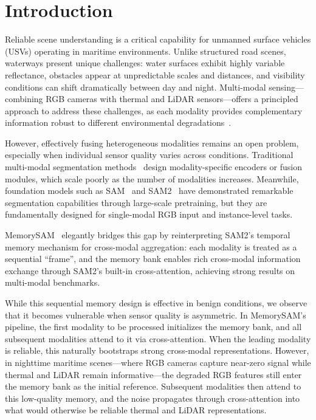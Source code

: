 \section{Introduction}
\label{sec:intro}

Reliable scene understanding is a critical capability for unmanned surface vehicles (USVs) operating in maritime environments.
Unlike structured road scenes, waterways present unique challenges: water surfaces exhibit highly variable reflectance, obstacles appear at unpredictable scales and distances, and visibility conditions can shift dramatically between day and night.
Multi-modal sensing---combining RGB cameras with thermal and LiDAR sensors---offers a principled approach to address these challenges, as each modality provides complementary information robust to different environmental degradations~\cite{zhang2023delivering, zhang2022cmx}.

However, effectively fusing heterogeneous modalities remains an open problem, especially when individual sensor quality varies across conditions.
Traditional multi-modal segmentation methods~\cite{zhang2023delivering, li2024stitchfusion, reza2024mmsformer} design modality-specific encoders or fusion modules, which scale poorly as the number of modalities increases.
Meanwhile, foundation models such as SAM~\cite{kirillov2023sam} and SAM2~\cite{ravi2024sam2} have demonstrated remarkable segmentation capabilities through large-scale pretraining, but they are fundamentally designed for single-modal RGB input and instance-level tasks.

MemorySAM~\cite{chen2025memorysam} elegantly bridges this gap by reinterpreting SAM2's temporal memory mechanism for cross-modal aggregation: each modality is treated as a sequential ``frame'', and the memory bank enables rich cross-modal information exchange through SAM2's built-in cross-attention, achieving strong results on multi-modal benchmarks.

While this sequential memory design is effective in benign conditions, we observe that it becomes vulnerable when sensor quality is asymmetric.
In MemorySAM's pipeline, the first modality to be processed initializes the memory bank, and all subsequent modalities attend to it via cross-attention.
When the leading modality is reliable, this naturally bootstraps strong cross-modal representations.
However, in nighttime maritime scenes---where RGB cameras capture near-zero signal while thermal and LiDAR remain informative---the degraded RGB features still enter the memory bank as the initial reference.
Subsequent modalities then attend to this low-quality memory, and the noise propagates through cross-attention into what would otherwise be reliable thermal and LiDAR representations.


